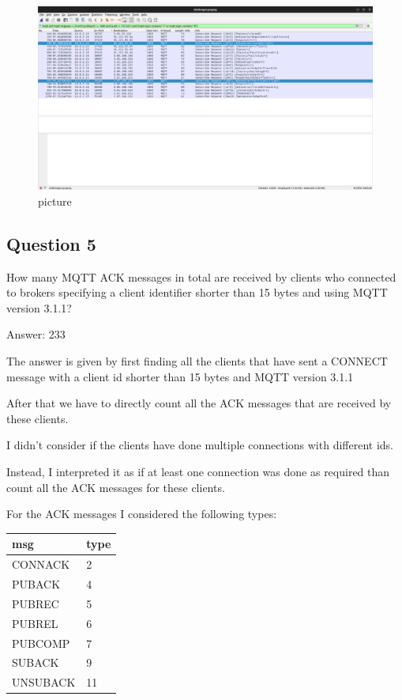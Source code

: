 \documentclass[11pt]{article}
\begin{document}
\begin{figure}
\centering
\includegraphics{4b.png}
\caption{picture}
\end{figure}

    \hypertarget{question-5}{%
\subsection{Question 5}\label{question-5}}

How many MQTT ACK messages in total are received by clients who
connected to brokers specifying a client identifier shorter than 15
bytes and using MQTT version 3.1.1?

Answer: 233

The answer is given by first finding all the clients that have sent a
CONNECT message with a client id shorter than 15 bytes and MQTT version
3.1.1

After that we have to directly count all the ACK messages that are
received by these clients.

I didn't consider if the clients have done multiple connections with
different ids.

Instead, I interpreted it as if at least one connection was done as
required than count all the ACK messages for these clients.

For the ACK messages I considered the following types:

\begin{longtable}[]{@{}ll@{}}
\toprule
msg & type\tabularnewline
\midrule
\endhead
CONNACK & 2\tabularnewline
PUBACK & 4\tabularnewline
PUBREC & 5\tabularnewline
PUBREL & 6\tabularnewline
PUBCOMP & 7\tabularnewline
SUBACK & 9\tabularnewline
UNSUBACK & 11\tabularnewline
\bottomrule
\end{longtable}
\end{document}
